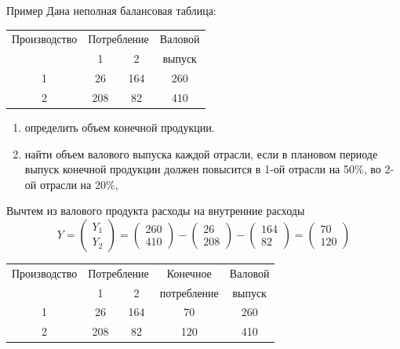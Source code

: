 \documentclass[unicode,11pt,notheorems,xcolor=table]{beamer}
\begin{document}
\begin{frame}[allowframebreaks]{Пример}{}
	Дана неполная балансовая таблица:
	{\centering
	\begin{tabular}{cccc}
		\hline
		Производство & \multicolumn{2}{c}{Потребление} & Валовой\\
		  &  1 &   2 & выпуск\\
		\hline
		1 &  26& 164 & 260\\
		2 & 208&  82 & 410\\
		\hline
	\end{tabular}
	\par}

	\medskip
	\begin{enumerate}
		\item определить объем конечной продукции.
		\item найти объем валового выпуска каждой отрасли, если в плановом периоде выпуск конечной продукции должен повысится в 1-ой отрасли на 50\%, во 2-ой отрасли на 20\%,
	\end{enumerate}
	\framebreak

	
	Вычтем из валового продукта расходы на внутренние расходы
	$$Y= 
		\begin{pmatrix}
			Y_1\\ Y_2
		\end{pmatrix}
	 	= 
		\begin{pmatrix}
			260\\ 410
		\end{pmatrix} 
		- 
		\begin{pmatrix}
			26\\ 208
		\end{pmatrix}
		-
		\begin{pmatrix}
			164 \\ 82
		\end{pmatrix}
		=
		\begin{pmatrix}
			70\\ 120
		\end{pmatrix}
	$$
	\bigskip
	{\centering
	\begin{tabular}{ccccc}
		\hline
		Производство & \multicolumn{2}{c}{Потребление}  &Конечное & Валовой\\
		  &  1 &   2 & потребление &выпуск\\
		\hline
		1 &  26& 164 &70& 260\\
		2 & 208&  82 &120& 410\\
		\hline
	\end{tabular}
	\par}


\end{frame}
\end{document}

